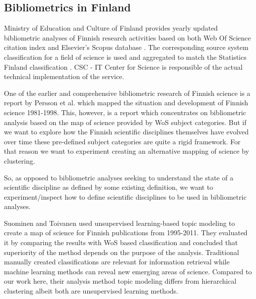 

\subsection{Bibliometrics in Finland}
Ministry of Education and Culture of Finland provides yearly
updated bibliometric analyses of Finnish research activities 
based on both Web Of Science citation index 
and Elsevier's Scopus database \cite[Vipunen 
service]{noauthor_ministry_2019}. The corresponding source 
system classification for a field of science is used and
aggregated to match the Statistics Finland classification 
\cite{auranen_tieteen_2018}. CSC - 
IT Center for Science is responsible of the actual technical 
implementation of the service.

One of the earlier and comprehensive bibliometric research of 
Finnish science is a report by Persson et al. 
\cite{persson_bibliometric_2000} which mapped the situation and 
development of Finnish science 1981-1998.
This, however, is a report which concentrates on bibliometric 
analysis based on the map of science provided by WoS subject 
categories. But if we want to explore how the Finnish scientific 
disciplines themselves have evolved over time these pre-defined 
subject categories are quite a rigid framework. For that reason we 
want to experiment creating an alternative mapping of science by 
clustering. 

So, as opposed to bibliometric analyses seeking to understand the
state of a scientific discipline as defined by some existing 
definition, we want to experiment/inspect how to define 
scientific disciplines to be used in bibliometric analyses.


Suominen and Toivanen \cite{suominen_map_2016} used unsupervised learning-based topic 
modeling to create a map of science for Finnish publications from 
1995-2011. They evaluated it by comparing the results with WoS 
based classification and concluded that superiority of the method
depends on the purpose of the analysis. Traditional manually created 
classifications are relevant for information retrieval while 
machine learning methods can reveal new emerging areas of science.
Compared to our work here, their 
analysis method topic modeling differs from hierarchical 
clustering albeit both are unsupervised learning methods.

